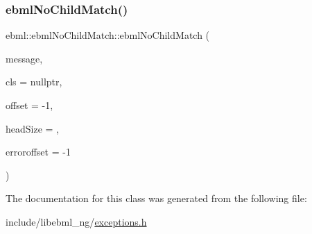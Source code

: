 \subsubsection{\texorpdfstring{ebml\+No\+Child\+Match()}{ebmlNoChildMatch()}}
{\footnotesize\ttfamily ebml\+::ebml\+No\+Child\+Match\+::ebml\+No\+Child\+Match (\begin{DoxyParamCaption}\item[{const std\+::string \&}]{message,  }\item[{const \mbox{\hyperlink{classebml_1_1ebmlElementClass}{ebml\+Element\+Class}} $\ast$}]{cls = {\ttfamily nullptr},  }\item[{off\+\_\+t}]{offset = {\ttfamily -\/1},  }\item[{unsigned char}]{head\+Size = {},  }\item[{off\+\_\+t}]{erroroffset = {\ttfamily -\/1} }\end{DoxyParamCaption})}



The documentation for this class was generated from the following file\+:\begin{DoxyCompactItemize}
\item 
include/libebml\+\_\+ng/\mbox{\hyperlink{exceptions_8h}{exceptions.\+h}}\end{DoxyCompactItemize}
